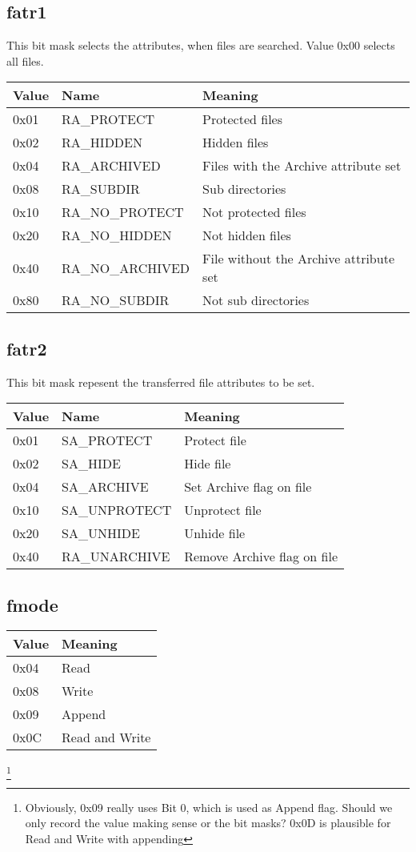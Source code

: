 \documentclass[10pt]{article}
\begin{document}
\subsection{fatr1}\label{PCLINK:FATR1}
This bit mask selects the attributes, when files are searched. Value 0x00 selects all files.

\begin{tabular}{l|l|l}
Value & Name & Meaning \\ \hline
0x01 & RA\_PROTECT & Protected files \\
0x02 & RA\_HIDDEN & Hidden files \\
0x04 & RA\_ARCHIVED & Files with the Archive attribute set \\
0x08 & RA\_SUBDIR & Sub directories \\
0x10 & RA\_NO\_PROTECT & Not protected files \\
0x20 & RA\_NO\_HIDDEN & Not hidden files \\
0x40 & RA\_NO\_ARCHIVED & File without the Archive attribute set \\
0x80 & RA\_NO\_SUBDIR & Not sub directories
\end{tabular}

\subsection{fatr2}\label{PCLINK:FATR2}
This bit mask repesent the transferred file attributes to be set.

\begin{tabular}{l|l|l}
Value & Name & Meaning \\ \hline
0x01 & SA\_PROTECT & Protect file \\
0x02 & SA\_HIDE & Hide file \\
0x04 & SA\_ARCHIVE & Set Archive flag on file \\
0x10 & SA\_UNPROTECT & Unprotect file \\
0x20 & SA\_UNHIDE & Unhide file \\
0x40 & RA\_UNARCHIVE & Remove Archive flag on file
\end{tabular}

\subsection{fmode}\label{PCLINK:FMODE}
\begin{tabular}{l|l}
Value & Meaning \\ \hline
0x04 & Read \\
0x08 & Write \\
0x09 & Append  \\
0x0C & Read and Write
\end{tabular}\footnote{Obviously, 0x09 really uses Bit 0, which is used as Append flag. Should we only record the value making sense or the bit masks? 0x0D is plausible for Read and Write with appending}
\end{document}
